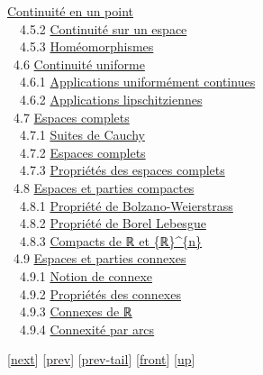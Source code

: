 \documentclass[]{article}
\begin{document}
\href{coursse22.html\#x29-1480004.5.1}{Continuité en un point} \\
~~4.5.2 \href{coursse22.html\#x29-1490004.5.2}{Continuité sur un espace}
\\ ~~4.5.3 \href{coursse22.html\#x29-1500004.5.3}{Homéomorphismes} \\
~4.6 \href{coursse23.html\#x30-1510004.6}{Continuité uniforme} \\
~~4.6.1 \href{coursse23.html\#x30-1520004.6.1}{Applications uniformément
continues} \\ ~~4.6.2
\href{coursse23.html\#x30-1530004.6.2}{Applications lipschitziennes} \\
~4.7 \href{coursse24.html\#x31-1540004.7}{Espaces complets} \\ ~~4.7.1
\href{coursse24.html\#x31-1550004.7.1}{Suites de Cauchy} \\ ~~4.7.2
\href{coursse24.html\#x31-1560004.7.2}{Espaces complets} \\ ~~4.7.3
\href{coursse24.html\#x31-1570004.7.3}{Propriétés des espaces complets}
\\ ~4.8 \href{coursse25.html\#x32-1580004.8}{Espaces et parties
compactes} \\ ~~4.8.1 \href{coursse25.html\#x32-1590004.8.1}{Propriété
de Bolzano-Weierstrass} \\ ~~4.8.2
\href{coursse25.html\#x32-1600004.8.2}{Propriété de Borel Lebesgue} \\
~~4.8.3 \href{coursse25.html\#x32-1610004.8.3}{Compacts de ℝ et
\{ℝ\}\^{}\{n\}} \\ ~4.9 \href{coursse26.html\#x33-1620004.9}{Espaces et
parties connexes} \\ ~~4.9.1
\href{coursse26.html\#x33-1630004.9.1}{Notion de connexe} \\ ~~4.9.2
\href{coursse26.html\#x33-1640004.9.2}{Propriétés des connexes} \\
~~4.9.3 \href{coursse26.html\#x33-1650004.9.3}{Connexes de ℝ} \\ ~~4.9.4
\href{coursse26.html\#x33-1660004.9.4}{Connexité par arcs}

{[}\href{coursch6.html}{next}{]} {[}\href{coursch4.html}{prev}{]}
{[}\href{coursch4.html\#tailcoursch4.html}{prev-tail}{]}
{[}\href{coursch5.html}{front}{]}
{[}\href{cours.html\#coursch5.html}{up}{]}
\end{document}
